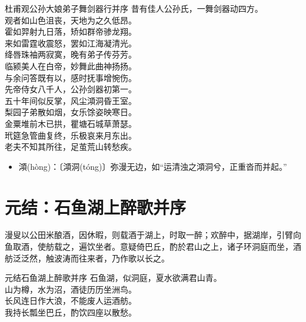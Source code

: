 \documentclass[12pt,oneside,a5paper]{book}
\begin{document}
\begin{poemzh}{杜甫}{观公孙大娘弟子舞剑器行并序}
昔有佳人公孙氏，一舞剑器动四方。\\
观者如山色沮丧，天地为之久低昂。\\
霍如羿射九日落，矫如群帝骖龙翔。\\
来如雷霆收震怒，罢如江海凝清光。\\
绛唇珠袖两寂寞，晚有弟子传芬芳。\\
临颍美人在白帝，妙舞此曲神扬扬。\\
与余问答既有以，感时抚事增惋伤。\\
先帝侍女八千人，公孙剑器初第一。\\
五十年间似反掌，风尘澒洞昏王室。\\
梨园子弟散如烟，女乐馀姿映寒日。\\
金粟堆前木已拱，瞿塘石城草萧瑟。\\
玳筵急管曲复终，乐极哀来月东出。\\
老夫不知其所往，足茧荒山转愁疾。\\ 
\end{poemzh}

\begin{itemize}
\item 澒(hòng)：〔澒洞(tóng)〕弥漫无边，如“运清浊之澒洞兮，正重沓而并起。”
\end{itemize}

\chapter{元结：石鱼湖上醉歌并序}
漫叟以公田米酿酒，因休暇，则载酒于湖上，时取一醉；欢醉中，据湖岸，引臂向鱼取酒，使舫载之，遍饮坐者。意疑倚巴丘，酌於君山之上，诸子环洞庭而坐，酒舫泛泛然，触波涛而往来者，乃作歌以长之。

\begin{poemzh}{元结}{石鱼湖上醉歌并序}
石鱼湖，似洞庭，夏水欲满君山青。\\
山为樽，水为沼，酒徒历历坐洲鸟。\\
长风连日作大浪，不能废人运酒舫。\\
我持长瓢坐巴丘，酌饮四座以散愁。\\ 
\end{poemzh}
\end{document}
